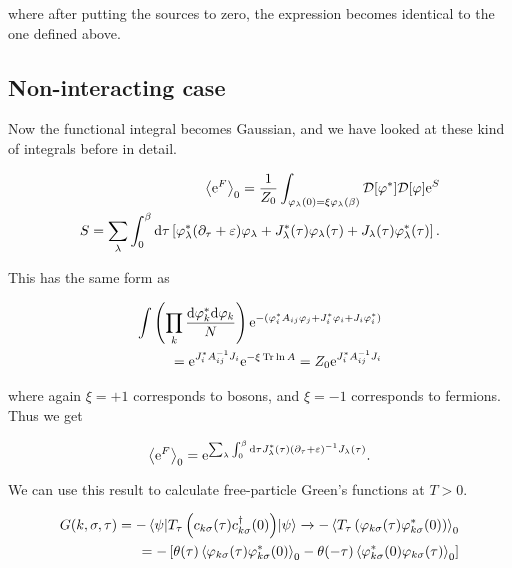 where after putting the sources to zero, the expression becomes identical to the one defined above.

\subsection{Non-interacting case}

Now the functional integral becomes Gaussian, and we have looked at these kind of integrals before in detail. 

\begin{align*}
    \expval{\mathrm{e}^F}_0 = \frac{1}{Z_0}\int_{\varphi_\lambda(0) = \xi \varphi_\lambda(\beta)} \mathcal{D} [\varphi^*] \mathcal{D}[\varphi]\mathrm{e}^{S} \\ 
    S = \sum_\lambda \int_{0}^{\beta} \dd \tau \left[ \varphi_\lambda ^* ( \partial_\tau + \varepsilon) \varphi_\lambda + J_\lambda ^*(\tau)\varphi_\lambda(\tau) + J_\lambda (\tau)\varphi_\lambda ^*(\tau) \right].
\end{align*}

This has the same form as 

\begin{align*}
    \int \left(\prod_k \frac{\dd \varphi_k^* \dd \varphi_k}{N} \right) \mathrm{e}^{-\left( \varphi_i^*A_{ij}\varphi_j + J_i ^* \varphi_i + J_i \varphi_i ^* \right)} \\  
    = \mathrm{e}^{J_i ^* A_{ij}^{-1} J_i} \mathrm{e}^{-\xi \Tr \ln{A}} = Z_0 \mathrm{e}^{J_i ^* A_{ij}^{-1} J_i}
\end{align*}

where again $\xi = +1$ corresponds to bosons, and $\xi = -1$ corresponds to fermions. Thus we get 

\begin{equation*}
    \expval{\mathrm{e}^F}_0  = \mathrm{e}^{\sum_\lambda \int_{0}^{\beta} \dd \tau J_\lambda ^*(\tau) (\partial_\tau + \varepsilon)^{-1}J_\lambda(\tau)}. 
\end{equation*}

We can use this result to calculate free-particle Green's functions at $T > 0$. 

\begin{align*}
    G(k, \sigma, \tau) = -\ev{T_\tau \left( c_{k\sigma}(\tau)c^{\dagger}_{k\sigma}(0)\right)}{\psi} \xrightarrow{} - \expval{T_\tau \left(\varphi_{k\sigma}(\tau) \varphi^{*}_{k\sigma}(0)\right)}_0 \\ 
    = -\left[ \theta(\tau) \expval{\varphi_{k\sigma}(\tau) \varphi^{*}_{k\sigma}(0)}_0  - \theta(-\tau)\expval{\varphi^{*}_{k\sigma}(0) \varphi_{k\sigma}(\tau)}_0\right]
\end{align*}

